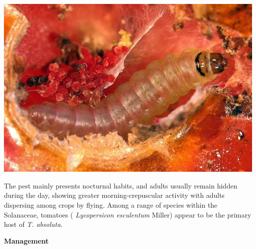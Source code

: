 \documentclass[
]{book}
\begin{document}
\begin{center}\includegraphics[width=0.8\linewidth]{./images/tuta_absoluta} \end{center}

The pest mainly presents nocturnal habits, and adults usually remain hidden during the day, showing greater morning-crepuscular activity with adults dispersing among crops by flying. Among a range of species within the Solanaceae, tomatoes ( \emph{Lycopersicon esculentum} Miller) appear to be the primary host of \emph{T. absoluta}.

\textbf{Management}
\end{document}
